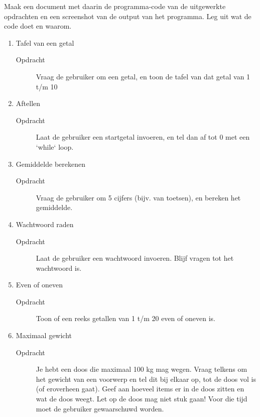 Maak een document met daarin de programma-code van de uitgewerkte opdrachten en een screenshot van de output van het programma. Leg uit wat de code doet en waarom.

\begin{enumerate}
\item Tafel van een getal
	\begin{description}
	\item[Opdracht] Vraag de gebruiker om een getal, en toon de tafel van dat getal van 1 t/m 10
	\end{description}

\item Aftellen
	\begin{description}
	\item[Opdracht] Laat de gebruiker een startgetal invoeren, en tel dan af tot 0 met een `while` loop.
	\end{description}

\item Gemiddelde berekenen
	\begin{description}
	\item[Opdracht] Vraag de gebruiker om 5 cijfers (bijv. van toetsen), en bereken het gemiddelde.
	\end{description}

\item Wachtwoord raden
	\begin{description}
	\item[Opdracht] Laat de gebruiker een wachtwoord invoeren. Blijf vragen tot het wachtwoord  is.
	\end{description}

\item Even of oneven
	\begin{description}
	\item[Opdracht] Toon of een reeks getallen van 1 t/m 20 even of oneven is.
	\end{description}

\item Maximaal gewicht
	\begin{description}
	\item[Opdracht] Je hebt een doos die maximaal 100 kg mag wegen. Vraag telkens om het gewicht van een voorwerp en tel dit bij elkaar op, tot de doos vol is (of eroverheen gaat). Geef aan hoeveel items er in de doos zitten en wat de doos weegt. Let op de doos mag niet stuk gaan! Voor die tijd moet de gebruiker gewaarschuwd worden.
	\end{description}

\end{enumerate}
